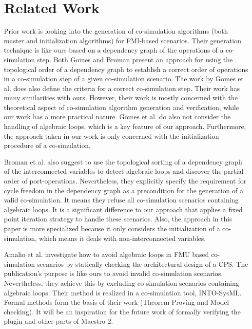 \section{Related Work}
Prior work \cite{Gomes2019, BromanCompositionCo-Simulation} is looking into the generation of co-simulation algorithms (both master and initialization algorithms) for FMI-based scenarios. Their generation technique is like ours based on a dependency graph of the operations of a co-simulation step. Both Gomes and Broman present an approach for using the topological order of a dependency graph to establish a correct order of operations in a co-simulation step of a given co-simulation scenario.
The work by Gomes et al. \cite{Gomes2019} does also define the criteria for a correct co-simulation step. Their work has many similarities with ours. However, their work is mostly concerned with the theoretical aspect of co-simulation algorithm generation and verification, while our work has a more practical nature. Gomes et al. do also not consider the handling of algebraic loops, which is a key feature of our approach. Furthermore, the approach taken in our work is only concerned with the initialization procedure of a co-simulation.

Broman et al. \cite{BromanCompositionCo-Simulation} also suggest to use the topological sorting of a dependency graph of the interconnected variables to detect algebraic loops and discover the partial order of port-operations. Nevertheless, they explicitly specify the requirement for cycle freedom in the dependency graph as a precondition for the generation of a valid co-simulation. It means they refuse all co-simulation scenarios containing algebraic loops. It is a significant difference to our approach that applies a fixed point iteration strategy to handle these scenarios. Also, the approach in this paper is more specialized because it only considers the initialization of a co-simulation, which means it deals with non-interconnected variables.

Amalio et al. \cite{Amalio2016CheckingCo-simulation} investigate how to avoid algebraic loops in FMU based co-simulation scenarios by statically checking the architectural design of a CPS. The publication's purpose is like ours to avoid invalid co-simulation scenarios. Nevertheless, they achieve this by excluding co-simulation scenarios containing algebraic loops. Their method is realized in a co-simulation tool, INTO-SysML\cite{Miyazawa2016INtegratedModelling}. Formal methods form the basis of their work (Theorem Proving and Model-checking). It will be an inspiration for the future work of formally verifying the plugin and other parts of Maestro 2. 

